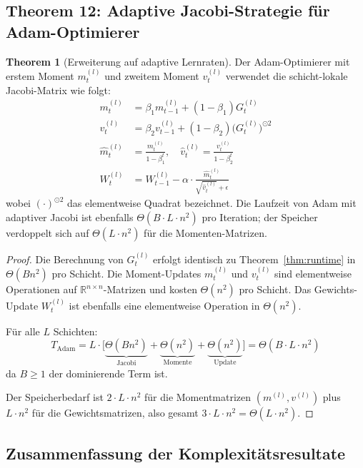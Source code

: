 ﻿\documentclass[a4paper,12pt]{article}
\theoremstyle{definition}
\newtheorem{theorem}{Theorem}
\begin{document}
\subsection{Theorem 12: Adaptive Jacobi-Strategie für Adam-Optimierer}

\begin{theorem}[Erweiterung auf adaptive Lernraten]
	\label{thm:adam_jacobi}
	Der Adam-Optimierer \cite{Kingma2014} mit erstem Moment $m^{(l)}_t$ und zweitem Moment $v^{(l)}_t$ verwendet die schicht-lokale Jacobi-Matrix wie folgt:
	\begin{align*}
		m^{(l)}_t &= \beta_1 m^{(l)}_{t-1} + (1-\beta_1) G^{(l)}_t \\
		v^{(l)}_t &= \beta_2 v^{(l)}_{t-1} + (1-\beta_2) \bigl(G^{(l)}_t\bigr)^{\odot 2}\\
		\hat{m}^{(l)}_t &= \frac{m^{(l)}_t}{1-\beta_1^t}, \quad \hat{v}^{(l)}_t = \frac{v^{(l)}_t}{1-\beta_2^t}\\
		W^{(l)}_t &= W^{(l)}_{t-1} - \alpha \cdot \frac{\hat{m}^{(l)}_t}{\sqrt{\hat{v}^{(l)}_t} + \epsilon}
	\end{align*}
	wobei $(\cdot)^{\odot 2}$ das elementweise Quadrat bezeichnet. Die Laufzeit von Adam mit adaptiver Jacobi ist ebenfalls $\Theta(B \cdot L \cdot n^2)$ pro Iteration; der Speicher verdoppelt sich auf $\Theta(L \cdot n^2)$ für die Momenten-Matrizen.
\end{theorem}

\begin{proof}
	Die Berechnung von $G^{(l)}_t$ erfolgt identisch zu Theorem~\ref{thm:runtime} in $\Theta(B n^2)$ pro Schicht. Die Moment-Updates $m^{(l)}_t$ und $v^{(l)}_t$ sind elementweise Operationen auf $\mathbb{R}^{n \times n}$-Matrizen und kosten $\Theta(n^2)$ pro Schicht. Das Gewichts-Update $W^{(l)}_t$ ist ebenfalls eine elementweise Operation in $\Theta(n^2)$.
	
	Für alle $L$ Schichten:
	\[
	T_{\mathrm{Adam}} = L \cdot \bigl[\underbrace{\Theta(Bn^2)}_{\text{Jacobi}} + \underbrace{\Theta(n^2)}_{\text{Momente}} + \underbrace{\Theta(n^2)}_{\text{Update}}\bigr] = \Theta(B \cdot L \cdot n^2)
	\]
	da $B \geq 1$ der dominierende Term ist.
	
	Der Speicherbedarf ist $2 \cdot L \cdot n^2$ für die Momentmatrizen $(m^{(l)}, v^{(l)})$ plus $L \cdot n^2$ für die Gewichtsmatrizen, also gesamt $3 \cdot L \cdot n^2 = \Theta(L \cdot n^2)$.
\end{proof}

\subsection{Zusammenfassung der Komplexitätsresultate}
\end{document}
